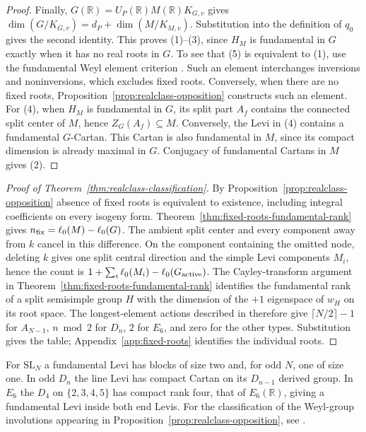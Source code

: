 \documentclass[12pt]{amsart}
\numberwithin{equation}{section}
\theoremstyle{plain}
\theoremstyle{definition}
\theoremstyle{remark}
\newcommand{\R}{\mathbb R}
\newcommand{\SL}{\mathrm{SL}}
\begin{document}
\begin{proof}
Finally, $G(\mathbb R)=U_P(\mathbb R)M(\mathbb R)K_{G,v}$ gives $\dim(G/K_{G,v})=d_P+\dim(M/K_{M,v})$. Substitution into the definition of $q_0$ gives the second identity. This proves (1)--(3), since $H_M$ is fundamental in $G$ exactly when it has no real roots in $G$. To see that (5) is equivalent to (1), use the fundamental Weyl element criterion \cite[Lemma~8.7]{SaperMicro}. Such an element interchanges inversions and noninversions, which excludes fixed roots. Conversely, when there are no fixed roots, Proposition~\ref{prop:realclass-opposition} constructs such an element. For (4), when $H_M$ is fundamental in $G$, its split part $A_f$ contains the connected split center of $M$, hence $Z_G(A_f)\subseteq M$. Conversely, the Levi in (4) contains a fundamental $G$-Cartan. This Cartan is also fundamental in $M$, since its compact dimension is already maximal in $G$. Conjugacy of fundamental Cartans in $M$ gives (2). 
\end{proof}

\begin{proof}[Proof of Theorem~\ref{thm:realclass-classification}]
By Proposition~\ref{prop:realclass-opposition} absence of fixed roots is equivalent to existence, including integral coefficients on every isogeny form. Theorem~\ref{thm:fixed-roots-fundamental-rank} gives $n_{\rm fix}=\ell_0(M)-\ell_0(G)$. The ambient split center and every component away from $k$ cancel in this difference. On the component containing the omitted node, deleting $k$ gives one split central direction and the simple Levi components $M_i$, hence the count is $1+\sum_i\ell_0(M_i)-\ell_0(G_{\rm active})$. The Cayley-transform argument in Theorem~\ref{thm:fixed-roots-fundamental-rank} identifies the fundamental rank of a split semisimple group $H$ with the dimension of the $+1$ eigenspace of $w_H$ on its root space. The longest-element actions described in \cite[\S3]{ConradBruhat} therefore give $\lceil N/2\rceil-1$ for $A_{N-1}$, $n\bmod2$ for $D_n$, $2$ for $E_6$, and zero for the other types. Substitution gives the table; Appendix~\ref{app:fixed-roots} identifies the individual roots.
\end{proof}

For $\SL_N$ a fundamental Levi has blocks of size two and, for odd $N$, one of size one. In odd $D_n$ the line Levi has compact Cartan on its $D_{n-1}$ derived group. In $E_6$ the $D_4$ on $\{2,3,4,5\}$ has compact rank four, that of $E_6(\R)$, giving a fundamental Levi inside both end Levis. For the classification of the Weyl-group involutions appearing in Proposition~\ref{prop:realclass-opposition}, see \cite[Theorem~A]{Richardson1982}. 
\end{document}
